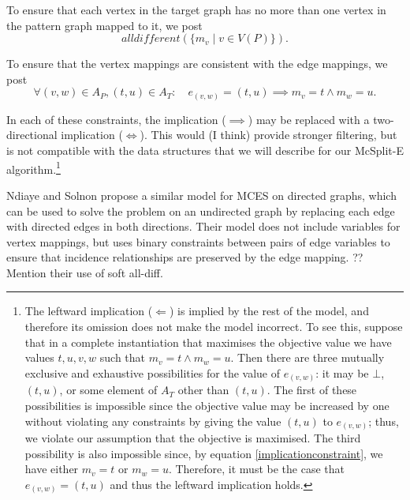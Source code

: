 To ensure that each vertex in the target graph has no more than one vertex in the pattern graph mapped
to it, we post
\[
\textit{alldifferent}(\{m_v \mid v \in V(P)\}).
\]

To ensure that the vertex mappings are consistent with the edge mappings, we post
\begin{equation}
\label{implicationconstraint}
\forall (v,w) \in A_P, (t,u) \in A_T : \quad e_{(v,w)} = (t,u) \implies m_v=t \wedge m_w=u.
\end{equation}

In each of these constraints, the implication ($\implies$) may be replaced with a two-directional
implication ($\Longleftrightarrow$).  This would (I think) provide stronger filtering, but is not
compatible with the data structures that we will describe for our McSplit-E
algorithm.\footnote{The leftward implication ($\Longleftarrow$)
is implied by the rest of the model, and therefore its omission does not make the model incorrect.
To see this, suppose that in a complete instantiation that maximises the objective value
we have values $t,u,v,w$ such
that $m_v=t \wedge m_w=u$.  Then there are three mutually exclusive and exhaustive possibilities for the
value of $e_{(v,w)}$: it may be $\bot$, $(t,u)$, or some element of $A_T$ other than $(t,u)$.
The first of these possibilities is impossible since the objective
value may be increased by one without violating any constraints by giving the value $(t,u)$ to $e_{(v,w)}$;
thus, we violate our assumption that the objective is maximised.
The third possibility is also impossible since, by equation \ref{implicationconstraint}, we have
either $m_v=t$ or $m_w=u$.  Therefore, it must be the case that $e_{(v,w)} = (t,u)$
and thus the leftward implication holds.}

Ndiaye and Solnon \cite{DBLP:conf/cp/NdiayeS11} propose a similar model for MCES on directed graphs,
which can be used to solve the problem on an undirected graph by replacing each edge with directed
edges in both directions.  Their model does not include variables for vertex mappings, but uses binary
constraints between pairs of edge variables to ensure that incidence relationships are preserved
by the edge mapping.  ?? Mention their use of soft all-diff.

%

